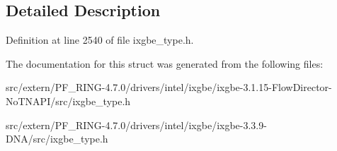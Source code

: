 \subsection{Detailed Description}


Definition at line 2540 of file ixgbe\_\-type.h.



The documentation for this struct was generated from the following files:\begin{DoxyCompactItemize}
\item 
src/extern/PF\_\-RING-\/4.7.0/drivers/intel/ixgbe/ixgbe-\/3.1.15-\/FlowDirector-\/NoTNAPI/src/ixgbe\_\-type.h\item 
src/extern/PF\_\-RING-\/4.7.0/drivers/intel/ixgbe/ixgbe-\/3.3.9-\/DNA/src/ixgbe\_\-type.h\end{DoxyCompactItemize}
